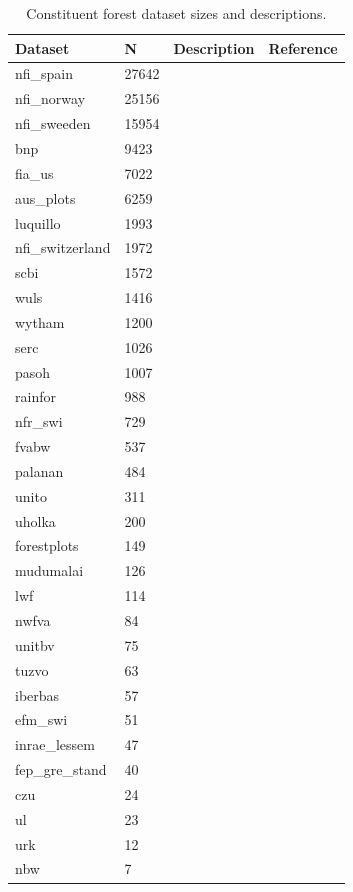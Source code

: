 \begin{table}[ht]
\centering
\begin{tabular}{llll}
  \hline
Dataset & N & Description & Reference \\ 
  \hline
nfi\_spain & 27642 &  &  \\ 
  nfi\_norway & 25156 &  &  \\ 
  nfi\_sweeden & 15954 &  &  \\ 
  bnp & 9423 &  &  \\ 
  fia\_us & 7022 &  &  \\ 
  aus\_plots & 6259 &  &  \\ 
  luquillo & 1993 &  &  \\ 
  nfi\_switzerland & 1972 &  &  \\ 
  scbi & 1572 &  &  \\ 
  wuls & 1416 &  &  \\ 
  wytham & 1200 &  &  \\ 
  serc & 1026 &  &  \\ 
  pasoh & 1007 &  &  \\ 
  rainfor & 988 &  &  \\
  nfr\_swi & 729 &  &  \\ 
  fvabw & 537 &  &  \\ 
  palanan & 484 &  &  \\ 
  unito & 311 &  &  \\ 
  uholka & 200 &  &  \\ 
  forestplots & 149 &  &  \\ 
  mudumalai & 126 &  &  \\ 
  lwf & 114 &  &  \\ 
  nwfva &  84 &  &  \\ 
  unitbv &  75 &  &  \\ 
  tuzvo &  63 &  &  \\ 
  iberbas &  57 &  &  \\ 
  efm\_swi &  51 &  &  \\ 
  inrae\_lessem &  47 &  &  \\ 
  fep\_gre\_stand &  40 &  &  \\ 
  czu &  24 &  &  \\ 
  ul &  23 &  &  \\ 
  urk &  12 &  &  \\ 
  nbw &   7 &  &  \\ 
  \end{tabular}
\caption{Constituent forest dataset sizes and descriptions.} 
\end{table}
